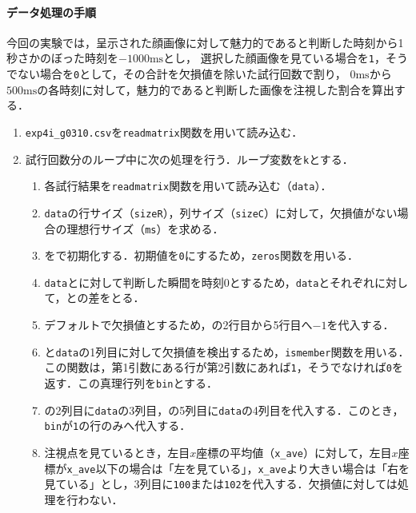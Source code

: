 \paragraph{データ処理の手順}
今回の実験では，呈示された顔画像に対して魅力的であると判断した時刻から1秒さかのぼった時刻を\(-1000\textrm{ms}\)とし，
選択した顔画像を見ている場合を\texttt{1}，そうでない場合を\texttt{0}として，その合計を欠損値を除いた試行回数で割り，
\(0\textrm{ms}\)から\(500\textrm{ms}\)の各時刻に対して，魅力的であると判断した画像を注視した割合を算出する．
\begin{enumerate}
    \item \texttt{exp4i\_g0310.csv}を\texttt{readmatrix}関数を用いて読み込む．
    \item 試行回数分のループ中に次の処理を行う．ループ変数を\texttt{k}とする．
          \begin{enumerate}
              \renewcommand{\theenumii}{\roman{enumii}}
              \renewcommand{\labelenumii}{\textbf{\theenumii}. }
              \newcommand{\dt}{\texttt{data}}
              \newcommand{\ms}{\texttt{ms}}
              \newcommand{\bn}{\texttt{bin}}
              \item 各試行結果を\texttt{readmatrix}関数を用いて読み込む（\dt ）．
              \item \dt の行サイズ（\texttt{sizeR}），列サイズ（\texttt{sizeC}）に対して，欠損値がない場合の理想行サイズ（\ms）を求める．
              \item \expos を\mat{\ms}{5}で初期化する．初期値を\texttt{0}にするため，\texttt{zeros}関数を用いる．
              \item \dt と\expos に対して判断した瞬間を時刻\(0\)とするため，\dt と\expos それぞれに対して，との差をとる．
              \item デフォルトで欠損値とするため，\expos の2行目から5行目へ\(-1\)を代入する．
              \item \expos と\dt の1列目に対して欠損値を検出するため，\texttt{ismember}関数を用いる．この関数は，第1引数にある行が第2引数にあれば\texttt{1}，そうでなければ\texttt{0}を返す．この真理行列を\bn とする．
              \item \expos の2列目に\dt の3列目，\expos の5列目に\dt の4列目を代入する．このとき，\bn が\texttt{1}の行のみ\expos へ代入する．
              \item 注視点を見ているとき，左目\(x\)座標の平均値（\texttt{x\_ave}）に対して，左目\(x\)座標が\texttt{x\_ave}以下の場合は「左を見ている」，\texttt{x\_ave}より大きい場合は「右を見ている」とし，\expos 3列目に\texttt{100}または\texttt{102}を代入する．欠損値に対しては処理を行わない．

\end{enumerate}
\end{enumerate}
